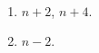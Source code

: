 \documentclass[addpoints,12pt]{exam}
\begin{document}
\begin{questions}
	\ifprintanswers
	  \begin{solution}\\
		\begin{enumerate}
		 \item $n+2$, $n+4$.
		 \item $n-2$.
		\end{enumerate}

	  \end{solution}
	\else
	  \makeemptybox{1.33in}
	\fi
\end{questions}
\vspace*{1cm}
\end{document}
